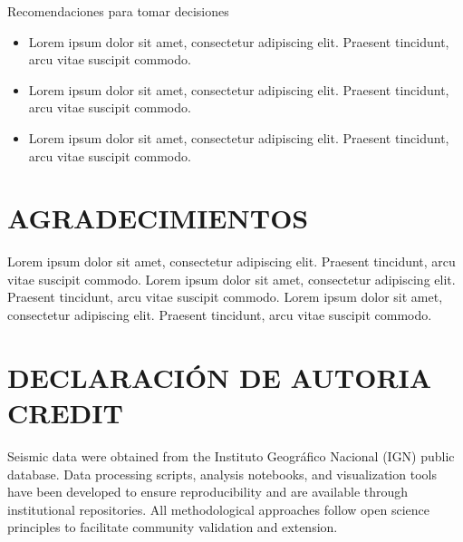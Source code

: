 \documentclass[
  spanish,
  letterpaper,
]{book}
\providecommand{\tightlist}{%
  \setlength{\itemsep}{0pt}\setlength{\parskip}{0pt}}
\begin{document}
\begin{tcolorbox}[enhanced jigsaw, rightrule=.15mm, colframe=quarto-callout-important-color-frame, opacityback=0, arc=.35mm, bottomrule=.15mm, toprule=.15mm, breakable, colback=white, leftrule=.75mm, left=2mm]

Recomendaciones para tomar decisiones

\begin{itemize}
\tightlist
\item
  Lorem ipsum dolor sit amet, consectetur adipiscing elit. Praesent
  tincidunt, arcu vitae suscipit commodo.
\item
  Lorem ipsum dolor sit amet, consectetur adipiscing elit. Praesent
  tincidunt, arcu vitae suscipit commodo.
\item
  Lorem ipsum dolor sit amet, consectetur adipiscing elit. Praesent
  tincidunt, arcu vitae suscipit commodo.
\end{itemize}

\end{tcolorbox}


\chapter{AGRADECIMIENTOS}\label{agradecimientos}

Lorem ipsum dolor sit amet, consectetur adipiscing elit. Praesent
tincidunt, arcu vitae suscipit commodo. Lorem ipsum dolor sit amet,
consectetur adipiscing elit. Praesent tincidunt, arcu vitae suscipit
commodo. Lorem ipsum dolor sit amet, consectetur adipiscing elit.
Praesent tincidunt, arcu vitae suscipit commodo.


\chapter{DECLARACIÓN DE AUTORIA
CREDIT}\label{declaraciuxf3n-de-autoria-credit}

Seismic data were obtained from the Instituto Geográfico Nacional (IGN)
public database. Data processing scripts, analysis notebooks, and
visualization tools have been developed to ensure reproducibility and
are available through institutional repositories. All methodological
approaches follow open science principles to facilitate community
validation and extension.

\end{document}
